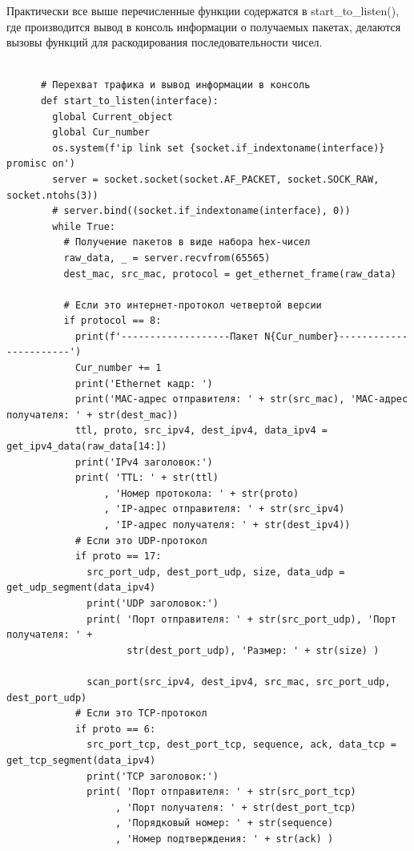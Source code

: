 \documentclass[bachelor, och, coursework]{SCWorks}
\begin{document}
    Практически все выше перечисленные функции содержатся в start\_to\_listen(), где производится вывод в консоль информации о получаемых пакетах, делаются
    вызовы функций для раскодирования последовательности чисел.

    \begin{verbatim}

      # Перехват трафика и вывод информации в консоль
      def start_to_listen(interface):
        global Current_object
        global Cur_number
        os.system(f'ip link set {socket.if_indextoname(interface)} promisc on')
        server = socket.socket(socket.AF_PACKET, socket.SOCK_RAW, socket.ntohs(3))
        # server.bind((socket.if_indextoname(interface), 0))
        while True:
          # Получение пакетов в виде набора hex-чисел
          raw_data, _ = server.recvfrom(65565)
          dest_mac, src_mac, protocol = get_ethernet_frame(raw_data)
      
          # Если это интернет-протокол четвертой версии    
          if protocol == 8:
            print(f'-------------------Пакет N{Cur_number}-----------------------')
            Cur_number += 1
            print('Ethernet кадр: ')
            print('MAC-адрес отправителя: ' + str(src_mac), 'MAC-адрес получателя: ' + str(dest_mac))
            ttl, proto, src_ipv4, dest_ipv4, data_ipv4 = get_ipv4_data(raw_data[14:])
            print('IPv4 заголовок:')
            print( 'TTL: ' + str(ttl)
                 , 'Номер протокола: ' + str(proto)
                 , 'IP-адрес отправителя: ' + str(src_ipv4)
                 , 'IP-адрес получателя: ' + str(dest_ipv4))
            # Если это UDP-протокол  
            if proto == 17:
              src_port_udp, dest_port_udp, size, data_udp = get_udp_segment(data_ipv4)
              print('UDP заголовок:')
              print( 'Порт отправителя: ' + str(src_port_udp), 'Порт получателя: ' + 
                     str(dest_port_udp), 'Размер: ' + str(size) )
              
              scan_port(src_ipv4, dest_ipv4, src_mac, src_port_udp, dest_port_udp)
            # Если это TCP-протокол  
            if proto == 6:
              src_port_tcp, dest_port_tcp, sequence, ack, data_tcp = get_tcp_segment(data_ipv4)
              print('TCP заголовок:')
              print( 'Порт отправителя: ' + str(src_port_tcp)
                   , 'Порт получателя: ' + str(dest_port_tcp)
                   , 'Порядковый номер: ' + str(sequence)
                   , 'Номер подтверждения: ' + str(ack) )
      

\end{verbatim}
\end{document}
